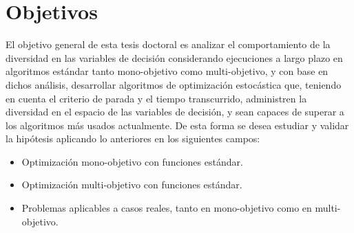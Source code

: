 \section{Objetivos}

El objetivo general de esta tesis doctoral es analizar el comportamiento de la diversidad en las variables de decisión 
considerando ejecuciones a largo plazo en algoritmos estándar tanto mono-objetivo como multi-objetivo, y con base en
dichos análisis, desarrollar algoritmos de optimización estocástica que, teniendo en cuenta el criterio de parada y el 
tiempo transcurrido, administren la diversidad en el espacio de las variables de decisión, y sean capaces de superar
a los algoritmos más usados actualmente.
%
De esta forma se desea estudiar y validar la hipótesis aplicando lo anteriores en los siguientes campos:
\begin{itemize}
	\item Optimización mono-objetivo con funciones estándar.
	\item Optimización multi-objetivo con funciones estándar.
	\item Problemas aplicables a casos reales, tanto en mono-objetivo como en multi-objetivo.
\end{itemize}
